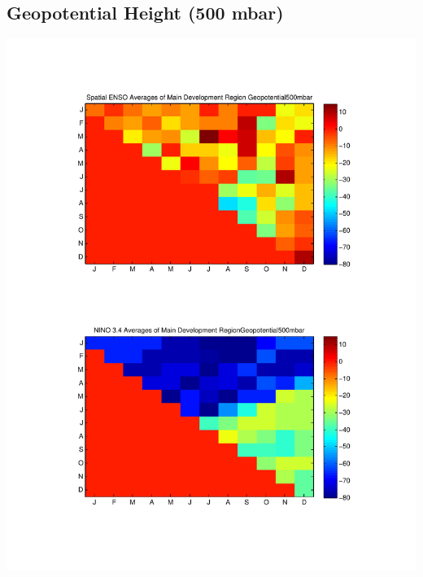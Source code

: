 \documentclass[11pt]{article}
\begin{document}
\subsection{Geopotential Height (500 mbar)}
\includegraphics[scale=0.7]{images/varyingMonthsForMDRAveragesGeopotential500mbar.pdf}
\end{document}
